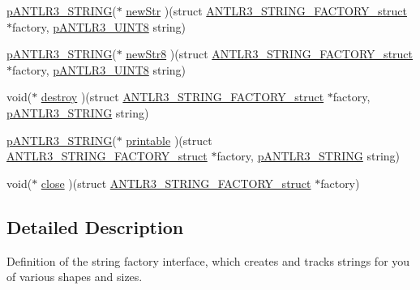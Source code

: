\begin{DoxyCompactItemize}
\item 
\hyperlink{antlr3interfaces_8h_a36bbe7362079348864db4b4dbdcce56b}{p\-A\-N\-T\-L\-R3\-\_\-\-S\-T\-R\-I\-N\-G}($\ast$ \hyperlink{struct_a_n_t_l_r3___s_t_r_i_n_g___f_a_c_t_o_r_y__struct_a7aa8c7669f01a6da359ca0729d635dd7}{new\-Str} )(struct \hyperlink{struct_a_n_t_l_r3___s_t_r_i_n_g___f_a_c_t_o_r_y__struct}{A\-N\-T\-L\-R3\-\_\-\-S\-T\-R\-I\-N\-G\-\_\-\-F\-A\-C\-T\-O\-R\-Y\-\_\-struct} $\ast$factory, \hyperlink{antlr3defs_8h_a95c800abcac5d607fd9e3e775ace78c5}{p\-A\-N\-T\-L\-R3\-\_\-\-U\-I\-N\-T8} string)
\item 
\hyperlink{antlr3interfaces_8h_a36bbe7362079348864db4b4dbdcce56b}{p\-A\-N\-T\-L\-R3\-\_\-\-S\-T\-R\-I\-N\-G}($\ast$ \hyperlink{struct_a_n_t_l_r3___s_t_r_i_n_g___f_a_c_t_o_r_y__struct_a9ad0272751d44c3651efee31c44088d6}{new\-Str8} )(struct \hyperlink{struct_a_n_t_l_r3___s_t_r_i_n_g___f_a_c_t_o_r_y__struct}{A\-N\-T\-L\-R3\-\_\-\-S\-T\-R\-I\-N\-G\-\_\-\-F\-A\-C\-T\-O\-R\-Y\-\_\-struct} $\ast$factory, \hyperlink{antlr3defs_8h_a95c800abcac5d607fd9e3e775ace78c5}{p\-A\-N\-T\-L\-R3\-\_\-\-U\-I\-N\-T8} string)
\item 
void($\ast$ \hyperlink{struct_a_n_t_l_r3___s_t_r_i_n_g___f_a_c_t_o_r_y__struct_ac74244ea330abbeef1ed7f519477f7b9}{destroy} )(struct \hyperlink{struct_a_n_t_l_r3___s_t_r_i_n_g___f_a_c_t_o_r_y__struct}{A\-N\-T\-L\-R3\-\_\-\-S\-T\-R\-I\-N\-G\-\_\-\-F\-A\-C\-T\-O\-R\-Y\-\_\-struct} $\ast$factory, \hyperlink{antlr3interfaces_8h_a36bbe7362079348864db4b4dbdcce56b}{p\-A\-N\-T\-L\-R3\-\_\-\-S\-T\-R\-I\-N\-G} string)
\item 
\hyperlink{antlr3interfaces_8h_a36bbe7362079348864db4b4dbdcce56b}{p\-A\-N\-T\-L\-R3\-\_\-\-S\-T\-R\-I\-N\-G}($\ast$ \hyperlink{struct_a_n_t_l_r3___s_t_r_i_n_g___f_a_c_t_o_r_y__struct_aed5e6914f4de787d7afd0b2a59b56b0d}{printable} )(struct \hyperlink{struct_a_n_t_l_r3___s_t_r_i_n_g___f_a_c_t_o_r_y__struct}{A\-N\-T\-L\-R3\-\_\-\-S\-T\-R\-I\-N\-G\-\_\-\-F\-A\-C\-T\-O\-R\-Y\-\_\-struct} $\ast$factory, \hyperlink{antlr3interfaces_8h_a36bbe7362079348864db4b4dbdcce56b}{p\-A\-N\-T\-L\-R3\-\_\-\-S\-T\-R\-I\-N\-G} string)
\item 
void($\ast$ \hyperlink{struct_a_n_t_l_r3___s_t_r_i_n_g___f_a_c_t_o_r_y__struct_af4da304dc103e7b5498dcbcd95f4026b}{close} )(struct \hyperlink{struct_a_n_t_l_r3___s_t_r_i_n_g___f_a_c_t_o_r_y__struct}{A\-N\-T\-L\-R3\-\_\-\-S\-T\-R\-I\-N\-G\-\_\-\-F\-A\-C\-T\-O\-R\-Y\-\_\-struct} $\ast$factory)
\end{DoxyCompactItemize}


\subsection{Detailed Description}
Definition of the string factory interface, which creates and tracks strings for you of various shapes and sizes. 

